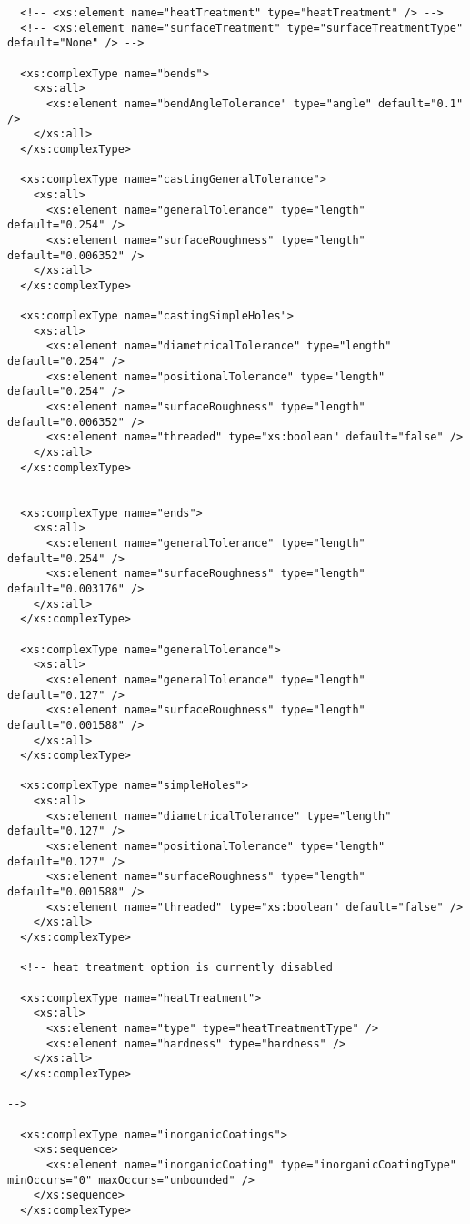 \begin{lstlisting}
  <!-- <xs:element name="heatTreatment" type="heatTreatment" /> -->
  <!-- <xs:element name="surfaceTreatment" type="surfaceTreatmentType" default="None" /> -->

  <xs:complexType name="bends">
    <xs:all>
      <xs:element name="bendAngleTolerance" type="angle" default="0.1" />
    </xs:all>
  </xs:complexType>

  <xs:complexType name="castingGeneralTolerance">
    <xs:all>
      <xs:element name="generalTolerance" type="length" default="0.254" />
      <xs:element name="surfaceRoughness" type="length" default="0.006352" />
    </xs:all>
  </xs:complexType>

  <xs:complexType name="castingSimpleHoles">
    <xs:all>
      <xs:element name="diametricalTolerance" type="length" default="0.254" />
      <xs:element name="positionalTolerance" type="length" default="0.254" />
      <xs:element name="surfaceRoughness" type="length" default="0.006352" />
      <xs:element name="threaded" type="xs:boolean" default="false" />
    </xs:all>
  </xs:complexType>


  <xs:complexType name="ends">
    <xs:all>
      <xs:element name="generalTolerance" type="length" default="0.254" />
      <xs:element name="surfaceRoughness" type="length" default="0.003176" />
    </xs:all>
  </xs:complexType>

  <xs:complexType name="generalTolerance">
    <xs:all>
      <xs:element name="generalTolerance" type="length" default="0.127" />
      <xs:element name="surfaceRoughness" type="length" default="0.001588" />
    </xs:all>
  </xs:complexType>

  <xs:complexType name="simpleHoles">
    <xs:all>
      <xs:element name="diametricalTolerance" type="length" default="0.127" />
      <xs:element name="positionalTolerance" type="length" default="0.127" />
      <xs:element name="surfaceRoughness" type="length" default="0.001588" />
      <xs:element name="threaded" type="xs:boolean" default="false" />
    </xs:all>
  </xs:complexType>

  <!-- heat treatment option is currently disabled

  <xs:complexType name="heatTreatment">
    <xs:all>
      <xs:element name="type" type="heatTreatmentType" />
      <xs:element name="hardness" type="hardness" />
    </xs:all>
  </xs:complexType>

-->

  <xs:complexType name="inorganicCoatings">
    <xs:sequence>
      <xs:element name="inorganicCoating" type="inorganicCoatingType" minOccurs="0" maxOccurs="unbounded" />
    </xs:sequence>
  </xs:complexType>


\end{lstlisting}
